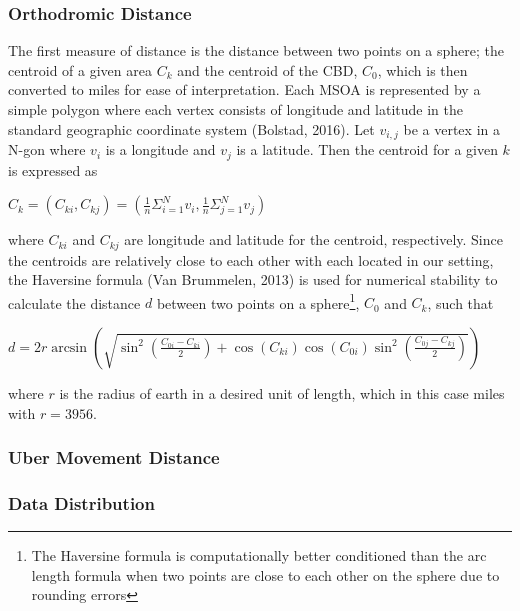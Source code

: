 \documentclass{article}
\begin{document}
\subsubsection{Orthodromic Distance}
The first measure of distance is the distance between two points on a sphere; the centroid of a given area $C_k$ and the centroid of the CBD, $C_0$, which is then converted to miles for ease of interpretation. Each MSOA is represented by a simple polygon where each vertex consists of longitude and latitude in the standard geographic coordinate system (Bolstad, 2016). Let $v_{i,j}$ be a vertex in a N-gon where $v_i$ is a longitude and $v_j$ is a latitude. Then the centroid for a given $k$ is expressed as 

\begin{center}
    $C_k = (C_{ki}, C_{kj})  = (\frac{1}{n} \Sigma_{i=1}^{N} v_i, \frac{1}{n} \Sigma_{j=1}^{N} v_j) $
\end{center}

where $C_{ki}$ and $C_{kj}$ are longitude and latitude for the centroid, respectively. Since the centroids are relatively close to each other with each located in our setting, the Haversine formula (Van Brummelen, 2013) is used for numerical stability to calculate the distance $d$ between two points on a sphere\footnote{The Haversine formula is computationally better conditioned than the arc length formula when two points are close to each other on the sphere due to rounding errors}, $C_0$ and $C_k$, such that

\begin{center}
    $d =2 r \arcsin \left(\sqrt{\sin ^{2}\left(\frac{C_{0i}-C_{ki}}{2}\right)+\cos \left(C_{ki}\right) \cos \left(C_{0i}\right) \sin ^{2}\left(\frac{C_{0j}-C_{kj}}{2}\right)}\right)$
\end{center}
where $r$ is the radius of earth in a desired unit of length, which in this case miles with $r = 3956$. 

\subsubsection{Uber Movement Distance}

\subsubsection{Data Distribution}
\end{document}
